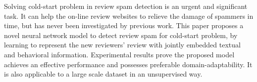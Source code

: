Solving cold-start problem in review spam detection is an urgent and significant task. It can help the on-line review websites to relieve the damage of spammers in time, but has never been investigated by previous work. This paper proposes a novel neural network model to detect review spam for cold-start problem, by learning to represent the new reviewers' review with jointly embedded textual and behavioral information. Experimental results prove the proposed model achieves an effective performance and possesses preferable domain-adaptability. It is also applicable to a large scale dataset in an unsupervised way.
